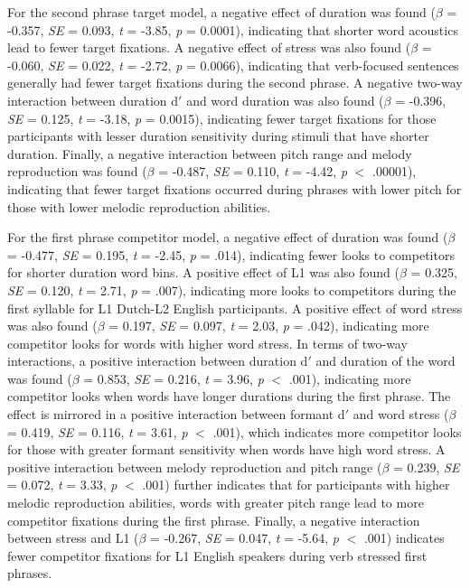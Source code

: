  For the second phrase target model, a negative effect of duration was found ($\beta$ = -0.357, \textit{SE} = 0.093, \textit{t} = -3.85, \textit{p} = 0.0001), indicating that shorter word acoustics lead to fewer target fixations. A negative effect of stress was also found ($\beta$ = -0.060, \textit{SE} = 0.022, \textit{t} = -2.72, \textit{p} = 0.0066), indicating that verb-focused sentences generally had fewer target fixations during the second phrase. A negative two-way interaction between duration d$'$ and word duration was also found ($\beta$ = -0.396, \textit{SE} = 0.125, \textit{t} = -3.18, \textit{p} = 0.0015), indicating fewer target fixations for those participants with lesser duration sensitivity during stimuli that have shorter duration. Finally, a negative interaction between pitch range and melody reproduction was found ($\beta$ = -0.487, \textit{SE} = 0.110, \textit{t} = -4.42, \textit{p} $<$ .00001), indicating that fewer target fixations occurred during phrases with lower pitch for those with lower melodic reproduction abilities.

 For the first phrase competitor model, a negative effect of duration was found ($\beta$ = -0.477, \textit{SE} = 0.195, \textit{t} = -2.45, \textit{p} = .014), indicating fewer looks to competitors for shorter duration word bins. A positive effect of L1 was also found ($\beta$ = 0.325, \textit{SE} = 0.120, \textit{t} = 2.71, \textit{p} = .007), indicating more looks to competitors during the first syllable for L1 Dutch-L2 English participants. A positive effect of word stress was also found ($\beta$ = 0.197, \textit{SE} = 0.097, \textit{t} = 2.03, \textit{p} = .042), indicating more competitor looks for words with higher word stress. In terms of two-way interactions, a positive interaction between duration d$'$ and duration of the word was found ($\beta$ = 0.853, \textit{SE} = 0.216, \textit{t} = 3.96, \textit{p} $<$ .001), indicating more competitor looks when words have longer durations during the first phrase. The effect is mirrored in a positive interaction between formant d$'$ and word stress ($\beta$ = 0.419, \textit{SE} = 0.116, \textit{t} = 3.61, \textit{p} $<$ .001), which indicates more competitor looks for those with greater formant sensitivity when words have high word stress. A positive interaction between melody reproduction and pitch range ($\beta$ = 0.239, \textit{SE} = 0.072, \textit{t} = 3.33, \textit{p} $<$ .001) further indicates that for participants with higher melodic reproduction abilities, words with greater pitch range lead to more competitor fixations during the first phrase. Finally, a negative interaction between stress and L1 ($\beta$ = -0.267, \textit{SE} = 0.047, \textit{t} = -5.64, \textit{p} $<$ .001) indicates fewer competitor fixations for L1 English speakers during verb stressed first phrases.


